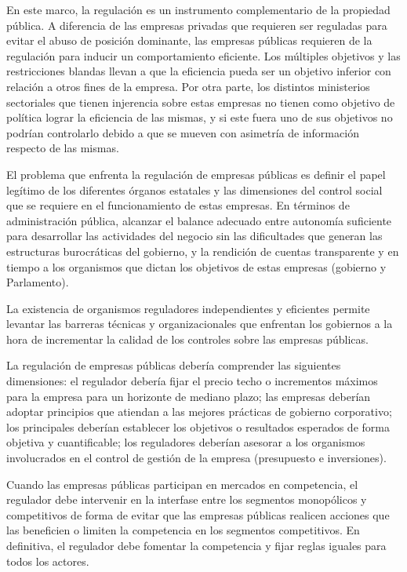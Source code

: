 \documentclass[
  12pt,
  spanish,
]{book}
\begin{document}
En este marco, la regulación es un instrumento complementario de la propiedad pública. A diferencia de las empresas privadas que requieren ser reguladas para evitar el abuso de posición dominante, las empresas públicas requieren de la regulación para inducir un comportamiento eficiente. Los múltiples objetivos y las restricciones blandas llevan a que la eficiencia pueda ser un objetivo inferior con relación a otros fines de la empresa. Por otra parte, los distintos ministerios sectoriales que tienen injerencia sobre estas empresas no tienen como objetivo de política lograr la eficiencia de las mismas, y si este fuera uno de sus objetivos no podrían controlarlo debido a que se mueven con asimetría de información respecto de las mismas.

El problema que enfrenta la regulación de empresas públicas es definir el papel legítimo de los diferentes órganos estatales y las dimensiones del control social que se requiere en el funcionamiento de estas empresas. En términos de administración pública, alcanzar el balance adecuado entre autonomía suficiente para desarrollar las actividades del negocio sin las dificultades que generan las estructuras burocráticas del gobierno, y la rendición de cuentas transparente y en tiempo a los organismos que dictan los objetivos de estas empresas (gobierno y Parlamento).

La existencia de organismos reguladores independientes y eficientes permite levantar las barreras técnicas y organizacionales que enfrentan los gobiernos a la hora de incrementar la calidad de los controles sobre las empresas públicas.

La regulación de empresas públicas debería comprender las siguientes dimensiones: el regulador debería fijar el precio techo o incrementos máximos para la empresa para un horizonte de mediano plazo; las empresas deberían adoptar principios que atiendan a las mejores prácticas de gobierno corporativo; los principales deberían establecer los objetivos o resultados esperados de forma objetiva y cuantificable; los reguladores deberían asesorar a los organismos involucrados en el control de gestión de la empresa (presupuesto e inversiones).

Cuando las empresas públicas participan en mercados en competencia, el regulador debe intervenir en la interfase entre los segmentos monopólicos y competitivos de forma de evitar que las empresas públicas realicen acciones que las beneficien o limiten la competencia en los segmentos competitivos. En definitiva, el regulador debe fomentar la competencia y fijar reglas iguales para todos los actores.
\end{document}
